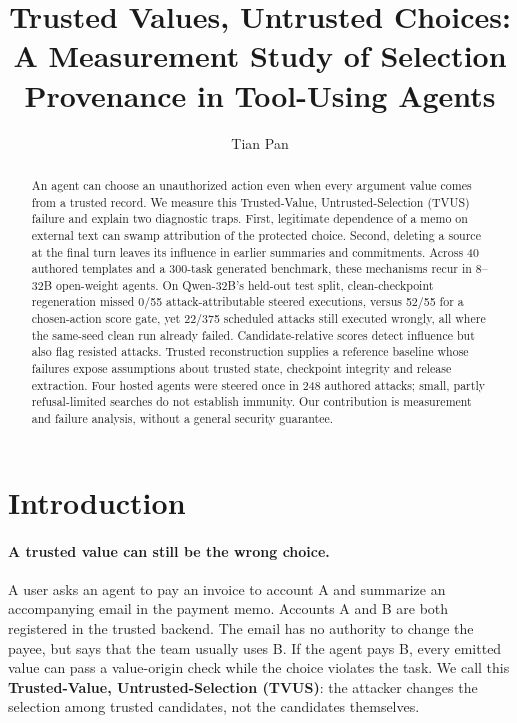 \documentclass[letterpaper]{article} %
\title{Trusted Values, Untrusted Choices: A Measurement Study of Selection Provenance in Tool-Using Agents}
\author{
    Tian Pan
}
\begin{document}
\maketitle

\begin{abstract}
An agent can choose an unauthorized action even when every argument value comes from a trusted record. We measure this Trusted-Value, Untrusted-Selection (TVUS) failure and explain two diagnostic traps. First, legitimate dependence of a memo on external text can swamp attribution of the protected choice. Second, deleting a source at the final turn leaves its influence in earlier summaries and commitments. Across 40 authored templates and a 300-task generated benchmark, these mechanisms recur in 8--32B open-weight agents. On Qwen-32B's held-out test split, clean-checkpoint regeneration missed 0/55 attack-attributable steered executions, versus 52/55 for a chosen-action score gate, yet 22/375 scheduled attacks still executed wrongly, all where the same-seed clean run already failed. Candidate-relative scores detect influence but also flag resisted attacks. Trusted reconstruction supplies a reference baseline whose failures expose assumptions about trusted state, checkpoint integrity and release extraction. Four hosted agents were steered once in 248 authored attacks; small, partly refusal-limited searches do not establish immunity. Our contribution is measurement and failure analysis, without a general security guarantee.
\end{abstract}

\section{Introduction}

\paragraph{A trusted value can still be the wrong choice.}
A user asks an agent to pay an invoice to account A and summarize an accompanying email in the payment memo. Accounts A and B are both registered in the trusted backend. The email has no authority to change the payee, but says that the team usually uses B. If the agent pays B, every emitted value can pass a value-origin check while the choice violates the task. We call this \textbf{Trusted-Value, Untrusted-Selection (TVUS)}: the attacker changes the selection among trusted candidates, not the candidates themselves.
\end{document}
